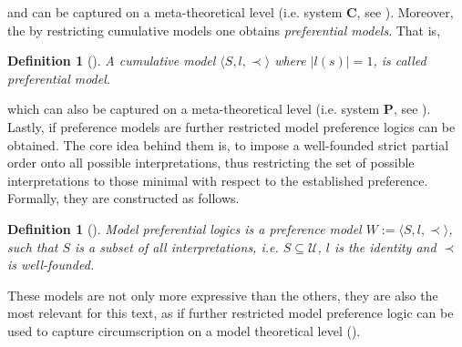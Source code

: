 \documentclass{extarticle}
\newtheorem{mydef}[thm]{Definition}
\begin{document}
and can be captured on a meta-theoretical level (i.e. system \textbf{C}, see \cite{kraus1990nonmonotonic}). Moreover, the by restricting cumulative models one obtains \emph{preferential models}. That is,

\begin{mydef}[\cite{kraus1990nonmonotonic}]

A cumulative model $\langle S,l, \prec \rangle$ where $|l(s)|=1$, is called preferential model.
\end{mydef}
which can also be captured on a meta-theoretical level (i.e. system \textbf{P}, see \cite{kraus1990nonmonotonic}). Lastly, if preference models are further restricted model preference logics can be obtained. The core idea behind them is, to impose a well-founded strict partial order onto all possible interpretations, thus restricting the set of possible interpretations to those minimal with respect to the established preference. Formally, they are constructed as follows.  

\begin{mydef}[\cite{kraus1990nonmonotonic}]
Model preferential logics is a preference model $W:=\langle S,l, \prec \rangle$, such that $S$ is a subset of all interpretations, i.e. $S \subseteq \mathcal{U}$, $l$ is the identity and $\prec$ is well-founded.
\end{mydef}

These models are not only more expressive than the others, they are also the most relevant for this text, as if further restricted model preference logic can be used to capture circumscription on a model theoretical level
(\cite{brewka1997nonmonotonic,BOCHMAN2007557}).
\end{document}
